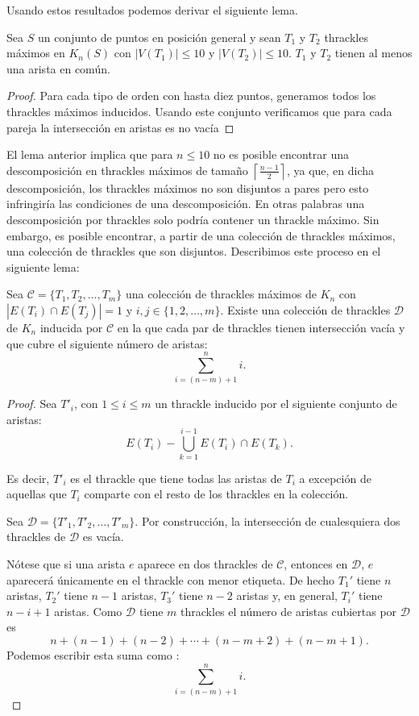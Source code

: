   Usando estos resultados podemos derivar el siguiente lema.
  \begin{lemma}\label{lema:thdisjuntos}
    Sea $S$ un conjunto de puntos en posición general y sean $T_1$ y $T_2$ thrackles máximos en $K_n(S)$
    con $|V(T_1)|\leq 10$ y $|V(T_2)|\leq 10$. $T_1$ y $T_2$ tienen al menos una arista en común.
  \end{lemma}
  \begin{proof}
    Para cada tipo de orden con hasta diez puntos, generamos todos los thrackles
    máximos inducidos. Usando este conjunto verificamos que para cada pareja la intersección en aristas es no vacía
  \end{proof}

  El lema anterior implica que para $n\leq 10$ no es posible encontrar una
  descomposición en thrackles máximos de tamaño
  $\left\lceil\frac{n-1}{2}\right\rceil$, ya que, en dicha descomposición, los
  thrackles máximos no son disjuntos a pares pero esto infringiría las
  condiciones de una descomposición.
  En otras palabras una descomposición por thrackles solo podría contener un
  thrackle máximo. Sin embargo, es posible encontrar, a partir de una colección
  de thrackles máximos, una colección de thrackles que son disjuntos.
  Describimos este proceso en el siguiente lema:
  \begin{lemma}\label{lema:existedescomp}
    Sea $\mathcal{C}=\{T_1,T_2,\dots,T_m\}$ una colección de thrackles máximos
    de $K_n$ con $|E(T_i)\cap E(T_j)| = 1$ y $ i,j \in \{1,2,\dots,m\}$.
    Existe una colección  de thrackles $\mathcal{D}$ de $K_n$ inducida por
    $\mathcal{C}$ en la que cada par de thrackles tienen intersección vacía y que
    cubre el siguiente número de aristas:
    \[\displaystyle \sum^n_{i=(n-m) + 1}i.\]
  \end{lemma}
  \begin{proof}
    Sea $T'_i$, con $1 \leq i \leq m$ un thrackle inducido por el siguiente
    conjunto de aristas:
    \[E(T_i) - \bigcup_{k=1}^{i-1} E(T_i)\cap E(T_k).\]

    Es decir, $T'_i$ es el thrackle que tiene todas las aristas de $T_i$
    a excepción de aquellas que $T_i$ comparte con el resto de los thrackles
    en la colección.

    Sea $\mathcal{D}=\{T'_1,T'_2,\dots,T'_m\}$. Por construcción, la intersección
    de cualesquiera dos thrackles de $\mathcal{D}$ es vacía.

    Nótese que si una arista $e$ aparece en dos thrackles de $\mathcal{C}$,
    entonces en $\mathcal{D}$, $e$ aparecerá únicamente en el thrackle con menor
    etiqueta.
    De hecho $T_1'$ tiene $n$ aristas, $T_2'$ tiene $n-1$ aristas, $T_3'$ tiene
    $n-2$ aristas y, en general, $T_i'$ tiene $n-i+1$ aristas. Como $\mathcal{D}$
    tiene $m$ thrackles el número de aristas cubiertas por $\mathcal{D}$ es
    \[ n + (n-1) + (n-2) + \cdots + (n- m + 2) + (n - m + 1).\]
    Podemos escribir esta suma como :
    \[\displaystyle \sum^n_{i=(n-m) + 1}i.\]
  \end{proof}
